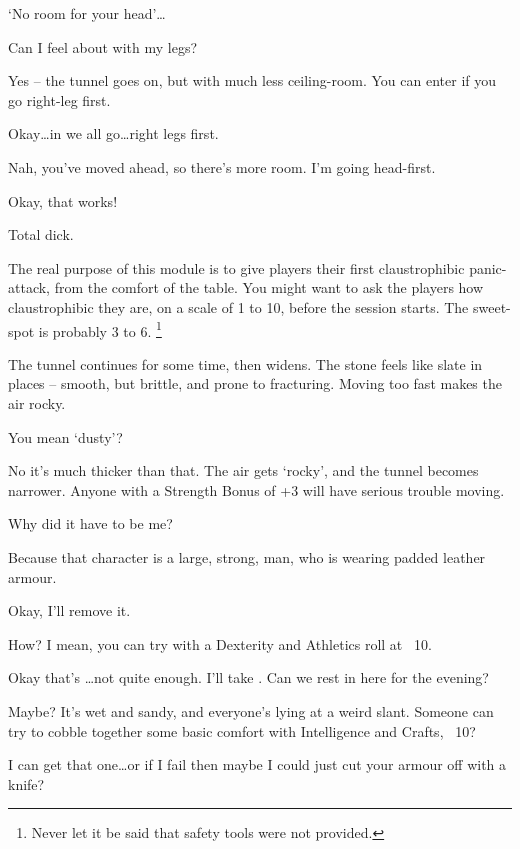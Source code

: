 \begin{multicols}{2}
\begin{description}
  `No room for your head'\ldots
  \item[Player 3:]
  Can I feel about with my legs?
  \item[\Glsentrytext{gm}:]
  Yes -- the tunnel goes on, but with much less ceiling-room.
  You can enter if you go right-leg first.
  \item[Player 3:]
  Okay\ldots in we all go\ldots right legs first.
  \item[Player 2:]
  Nah, you've moved ahead, so there's more room.
  I'm going head-first.
  \item[\Glsentrytext{gm}:]
  Okay, that works!
  \item[Player 3:]
  Total dick.
\end{description}

\bigLine
\vspace{2em}
\noindent
The real purpose of this module is to give players their first claustrophibic panic-attack, from the comfort of the table.
You might want to ask the players how claustrophibic they are, on a scale of 1 to 10, before the session starts.
The sweet-spot is probably 3 to 6.%
\footnote{Never let it be said that safety tools were not provided.}

\bigLine

\begin{description}\sf
  \item[\Glsentrytext{gm}:]
  The tunnel continues for some time, then widens.
  The stone feels like slate in places -- smooth, but brittle, and prone to fracturing.
  Moving too fast makes the air rocky.
  \item[Player 1:]
  You mean `dusty'?
  \item[\Glsentrytext{gm}:]
  No it's much thicker than that.
  The air gets `rocky', and the tunnel becomes narrower.
  Anyone with a Strength Bonus of +3 will have serious trouble moving.
  \item[Player 3:]
  Why did it have to be me?
  \item[\Glsentrytext{gm}:]
  Because that character is a large, strong, man, who is wearing padded leather armour.
  \item[Player 3:]
  Okay, I'll remove it.
  \item[\Glsentrytext{gm}:]
  How?
  I mean, you can try with a Dexterity and Athletics roll at ~10.
  \item[Player 3:]
  Okay that's \ldots not quite enough.
  I'll take .
  Can we rest in here for the evening?
  \item[\Glsentrytext{gm}:]
  Maybe?
  It's wet and sandy, and everyone's lying at a weird slant.
  Someone can try to cobble together some basic comfort with Intelligence and Crafts, ~10?
  \item[Player 1:]
  I can get that one\ldots or if I fail then maybe I could just cut your armour off with a knife?


\end{description}
\end{multicols}
